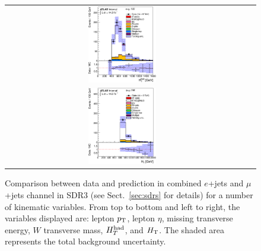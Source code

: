 \begin{figure}[h!]
\begin{center}
\begin{tabular}{ccc}
\includegraphics[width=0.30\textwidth]{appendices/figures/sdrs/HTHad_ELEMUONCR2_1W_NOMINAL.eps}  \\
\includegraphics[width=0.30\textwidth]{appendices/figures/sdrs/HTAll_ELEMUONCR2_1W_NOMINAL.eps}  &  &\\
\end{tabular}\caption{\small {Comparison between data and prediction in combined $e$+jets and $\mu$+jets channel in SDR3 (see Sect.~\ref{sec:sdrs} for details) 
for a number of kinematic variables. From top to bottom and left to right, the variables displayed are: lepton $\pt$, lepton $\eta$, missing transverse energy, $W$ transverse mass,
$\hthad$, and $\HT$. The shaded area represents the total background uncertainty.}}
\label{fig:ELEMUONCR2_1}
\end{center}
\end{figure}                                                                             

